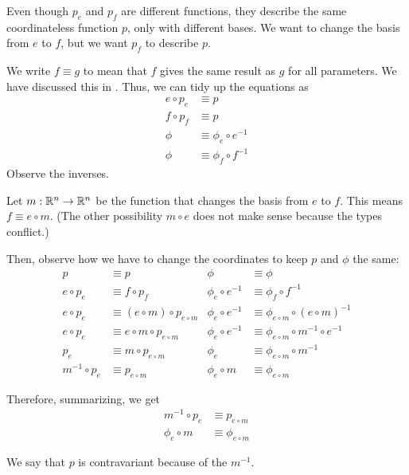 Even though \(p_e\) and \(p_f\) are different functions,
they describe the same coordinateless function \(p\), only with different bases.
We want to change the basis from \(e\) to \(f\), but we want \(p_f\) to describe \(p\).

We write \(f \equiv g\) to mean that \(f\) gives the same result as \(g\) for all parameters.
We have discussed this in .
Thus, we can tidy up the equations as
\begin{align*}
    e \circ p_e &\equiv p
    \\ f \circ p_f &\equiv p
    \\ \phi &\equiv \phi_e \circ e^{-1}
    \\ \phi &\equiv \phi_f \circ f^{-1}
\end{align*}
Observe the inverses.

Let \( m : \mathbb{R}^n \to \mathbb{R}^n \) be the function that changes the basis from \( e \) to \( f \).
This means \( f \equiv e \circ m \).
(The other possibility \(m \circ e\) does not make sense because the types conflict.)

Then, observe how we have to change the coordinates to keep \(p\) and \(\phi\) the same:
\begin{align*}
    p &\equiv p
    &
    \phi &\equiv \phi
    \\
    e \circ p_e &\equiv f \circ p_f
    &
    \phi_e \circ e^{-1} &\equiv \phi_f \circ f^{-1}
    \\
    e \circ p_e &\equiv (e \circ m) \circ p_{e \circ m}
    &
    \phi_e \circ e^{-1} &\equiv \phi_{e \circ m} \circ (e \circ m)^{-1}
    \\
    e \circ p_e &\equiv e \circ m \circ p_{e \circ m}
    &
    \phi_e \circ e^{-1} &\equiv \phi_{e \circ m} \circ m^{-1} \circ e^{-1}
    \\
    p_e &\equiv m \circ p_{e \circ m}
    &
    \phi_e &\equiv \phi_{e \circ m} \circ m^{-1}
    \\
    m^{-1} \circ p_e &\equiv p_{e \circ m}
    &
    \phi_e \circ m &\equiv \phi_{e \circ m}
\end{align*}

Therefore, summarizing, we get
\begin{align}
    m^{-1} \circ p_e &\equiv p_{e \circ m}
    \\ \phi_e \circ m &\equiv \phi_{e \circ m}
\end{align}

We say that \(p\) is contravariant because of the \(m^{-1}\).

